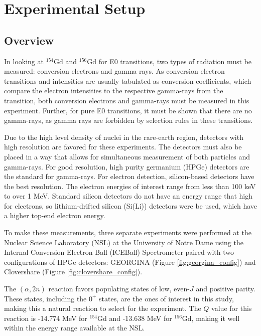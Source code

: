 %
%

\chapter{Experimental Setup}
\label{chap:setup}

\section{Overview}

In looking at $^{154}$Gd and $^{156}$Gd for E0 transitions, two types of radiation must be measured: conversion electrons and gamma rays. As conversion electron transitions and intensities are usually tabulated as conversion coefficients, which compare the electron intensities to the respective gamma-rays from the transition, both conversion electrons and gamma-rays must be measured in this experiment. Further, for pure E0 transitions, it must be shown that there are no gamma-rays, as gamma rays are forbidden by selection rules in these transitions. 

Due to the high level density of nuclei in the rare-earth region, detectors with high resolution are favored for these experiments. The detectors must also be placed in a way that allows for simultaneous measurement of both particles and gamma-rays. For good resolution, high purity germanium (HPGe) detectors are the standard for gamma-rays. For electron detection, silicon-based detectors have the best resolution. The electron energies of interest range from less than 100 keV to over 1 MeV. Standard silicon detectors do not have an energy range that high for electrons, so lithium-drifted silicon (Si(Li)) detectors were be used, which have a higher top-end electron energy.

To make these measurements, three separate experiments were performed at the Nuclear Science Laboratory (NSL) at the University of Notre Dame using the Internal Conversion Electron Ball (ICEBall) Spectrometer paired with two configurations of HPGe detectors: GEORGINA (Figure \ref{fig:georgina_config}) and Clovershare (Figure \ref{fig:clovershare_config}). 





The $(\alpha,2n)$ reaction favors populating states of low, even-$J$ and positive parity. These states, including the $0^+$ states, are the ones of interest in this study, making this a natural reaction to select for the experiment. The $Q$ value for this reaction is -14.774 MeV for $^{154}$Gd and -13.638 MeV for $^{156}$Gd, making it well within the energy range available at the NSL.

